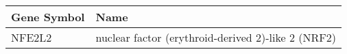 \begin{tabular}{ll}
\toprule
Gene Symbol &                                               Name \\
\midrule
     NFE2L2 & nuclear factor (erythroid-derived 2)-like 2 (NRF2) \\
\bottomrule
\end{tabular}
